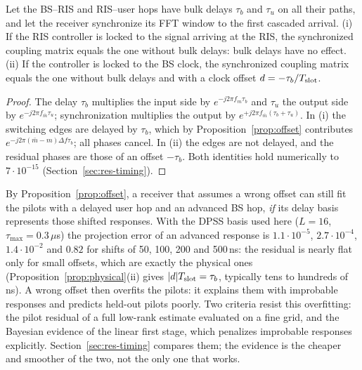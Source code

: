 \begin{proposition}\label{prop:physical}
Let the BS--RIS and RIS--user hops have bulk delays $\tau_b$ and $\tau_u$ on all their paths, and let the
receiver synchronize its FFT window to the first cascaded arrival. (i) If the RIS controller is locked to the
signal arriving at the RIS, the synchronized coupling matrix equals the one without bulk delays: bulk delays
have no effect. (ii) If the controller is locked to the BS clock, the synchronized coupling matrix equals the
one without bulk delays and with a clock offset $d=-\tau_b/T_{\rm slot}$.
\end{proposition}
\begin{proof}
The delay $\tau_b$ multiplies the input side by $e^{-j2\pi f_m\tau_b}$ and $\tau_u$ the output side by
$e^{-j2\pi f_{\bar m}\tau_u}$; synchronization multiplies the output by $e^{+j2\pi f_{\bar m}(\tau_b+\tau_u)}$. In (i) the
switching edges are delayed by $\tau_b$, which by Proposition~\ref{prop:offset} contributes
$e^{-j2\pi(\bar m-m)\Delta f\tau_b}$; all phases cancel. In (ii) the edges are not delayed, and the residual
phases are those of an offset $-\tau_b$. Both identities hold numerically to $7\cdot10^{-15}$
(Section~\ref{sec:res-timing}).
\end{proof}

\begin{remark}
By Proposition~\ref{prop:offset}, a receiver that assumes a wrong offset can still fit the pilots with a
delayed user hop and an advanced BS hop, \emph{if} its delay basis represents those shifted responses. With
the DPSS basis used here ($L=16$, $\tau_{\max}=0.3\,\mu$s) the projection error of an advanced response is
$1.1\cdot10^{-5}$, $2.7\cdot10^{-4}$, $1.4\cdot10^{-2}$ and $0.82$ for shifts of 50, 100, 200 and 500\,ns: the
residual is nearly flat only for small offsets, which are exactly the physical ones (Proposition~\ref{prop:physical}(ii)
gives $|d|T_{\rm slot}=\tau_b$, typically tens to hundreds of ns). A wrong offset then overfits the pilots:
it explains them with improbable responses and predicts held-out pilots poorly. Two criteria resist this
overfitting: the pilot residual of a full low-rank estimate evaluated on a fine grid, and the Bayesian evidence
of the linear first stage, which penalizes improbable responses explicitly. Section~\ref{sec:res-timing}
compares them; the evidence is the cheaper and smoother of the two, not the only one that works.
\end{remark}
